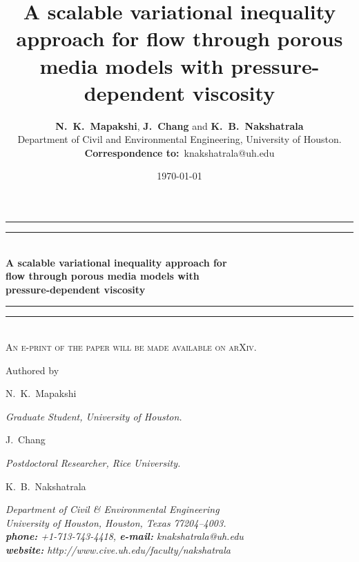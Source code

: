\documentclass[11pt,reqno]{amsproc}
\title{\textbf{A scalable variational inequality 
approach for flow through porous media 
models with pressure-dependent viscosity}}
\author{\textbf{N.~K.~Mapakshi}, \textbf{J.~Chang} and \textbf{K.~B.~Nakshatrala} \\
{\small Department of Civil and Environmental Engineering, 
  University of Houston. \\
  \textbf{Correspondence to:}~\textsf{knakshatrala@uh.edu}}}
\date{\today}
\numberwithin{equation}{section}
\newlength{\drop}
\begin{document}
\begin{titlepage}
  \textheight
  \centering
  \vspace*{\baselineskip}
  \rule{\textwidth}{1.6pt}\vspace*{-\baselineskip}\vspace*{2pt}
  \rule{\textwidth}{0.4pt}\\[\baselineskip]
  {\LARGE \textbf{\color{burgundy}
  A scalable variational inequality approach for  \\[0.2\baselineskip] 
  flow through porous media models with \\[0.2\baselineskip]
  pressure-dependent viscosity}}\\[0.3\baselineskip]
    \rule{\textwidth}{0.4pt}\vspace*{-\baselineskip}\vspace{3.2pt}
    \rule{\textwidth}{1.6pt}\\[0.5\baselineskip]
    \scshape
    An e-print of the paper will be made available on arXiv. \par
    \vspace*{0.5\baselineskip}
    Authored by \\[0.3\baselineskip]
    {\Large N.~K.~Mapakshi \par}
    {\itshape Graduate Student, University of Houston. \par}
    \vspace*{0.2\baselineskip}
    {\Large J.~Chang \par}
    {\itshape Postdoctoral Researcher, Rice University. \par}
    \vspace*{0.2\baselineskip}
    {\Large K.~B.~Nakshatrala\par}
    {\itshape Department of Civil \& Environmental Engineering \\
    University of Houston, Houston, Texas 77204--4003. \\ 
    \textbf{phone:} +1-713-743-4418, \textbf{e-mail:} knakshatrala@uh.edu \\
    \textbf{website:} http://www.cive.uh.edu/faculty/nakshatrala\par}    
    \vspace*{0.2\baselineskip}
   \begin{figure}[h]
   	\centering

\end{figure}
\end{titlepage}
\end{document}
